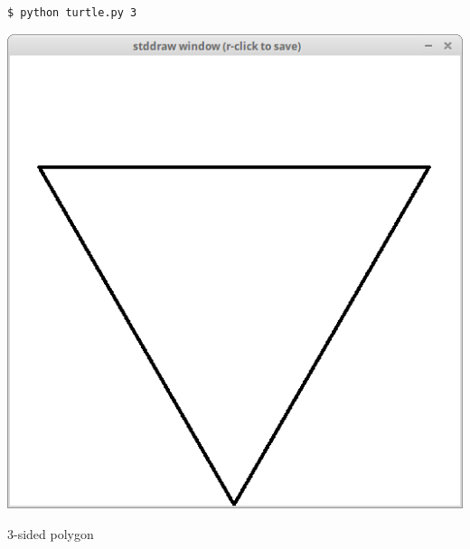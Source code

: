\documentclass[8pt,a4paper,compress,handout]{beamer}
\begin{document}
\begin{frame}[fragile]
\begin{minipage}{200pt}
\begin{lstlisting}[language={}]
$ python turtle.py 3
\end{lstlisting}
\end{minipage}%
\hfill
\begin{minipage}{100pt}
\begin{center}
\includegraphics[scale=0.12]{figures/turtle1.png}

\smallskip

\tiny 3-sided polygon
\end{center}
\end{minipage}%

\bigskip


\end{frame}
\end{document}
